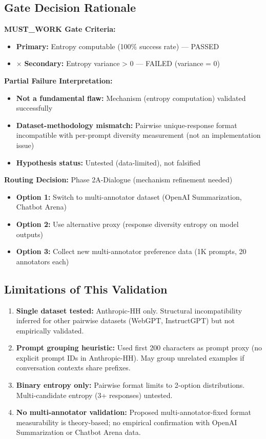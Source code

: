 \subsection{Gate Decision Rationale}

\textbf{MUST\_WORK Gate Criteria:}
\begin{itemize}
\item \checkmark \textbf{Primary:} Entropy computable (100\% success rate) — PASSED
\item $\times$ \textbf{Secondary:} Entropy variance > 0 — FAILED (variance = 0)
\end{itemize}

\textbf{Partial Failure Interpretation:}
\begin{itemize}
\item \textbf{Not a fundamental flaw:} Mechanism (entropy computation) validated successfully
\item \textbf{Dataset-methodology mismatch:} Pairwise unique-response format incompatible with per-prompt diversity measurement (not an implementation issue)
\item \textbf{Hypothesis status:} Untested (data-limited), not falsified
\end{itemize}

\textbf{Routing Decision:} Phase 2A-Dialogue (mechanism refinement needed)
\begin{itemize}
\item \textbf{Option 1:} Switch to multi-annotator dataset (OpenAI Summarization, Chatbot Arena)
\item \textbf{Option 2:} Use alternative proxy (response diversity entropy on model outputs)
\item \textbf{Option 3:} Collect new multi-annotator preference data (1K prompts, 20 annotators each)
\end{itemize}

\subsection{Limitations of This Validation}

\begin{enumerate}
\item \textbf{Single dataset tested:} Anthropic-HH only. Structural incompatibility inferred for other pairwise datasets (WebGPT, InstructGPT) but not empirically validated.

\item \textbf{Prompt grouping heuristic:} Used first 200 characters as prompt proxy (no explicit prompt IDs in Anthropic-HH). May group unrelated examples if conversation contexts share prefixes.

\item \textbf{Binary entropy only:} Pairwise format limits to 2-option distributions. Multi-candidate entropy (3+ responses) untested.

\item \textbf{No multi-annotator validation:} Proposed multi-annotator-fixed format measurability is theory-based; no empirical confirmation with OpenAI Summarization or Chatbot Arena data.
\end{enumerate}
